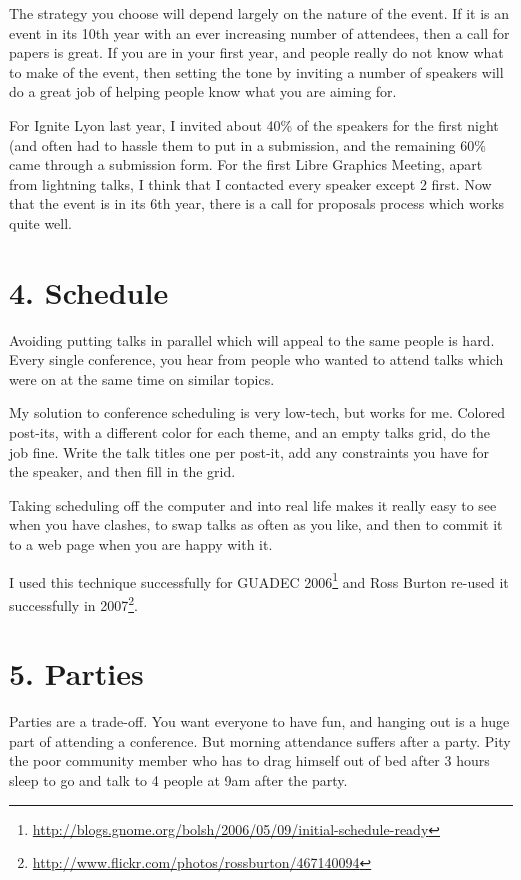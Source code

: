 The strategy you choose will depend largely on the nature of the event.
If it is an event in its 10th year with an ever increasing number of
attendees, then a call for papers is great. If you are in your first
year, and people really do not know what to make of the event, then
setting the tone by inviting a number of speakers will do a great job of
helping people know what you are aiming for.

For Ignite Lyon last year, I invited about 40\% of the speakers for the
first night (and often had to hassle them to put in a submission, and
the remaining 60\% came through a submission form. For the first Libre
Graphics Meeting, apart from lightning talks, I think that I contacted
every speaker except 2 first. Now that the event is in its 6th year,
there is a call for proposals process which works quite well.

\section*{4. Schedule}

Avoiding putting talks in parallel which will appeal to the same people
is hard. Every single conference, you hear from people who wanted to
attend talks which were on at the same time on similar topics.

My solution to conference scheduling is very low-tech, but works for me.
Colored post-its, with a different color for each theme, and an empty
talks grid, do the job fine. Write the talk titles one per post-it, add
any constraints you have for the speaker, and then fill in the grid.

Taking scheduling off the computer and into real life makes it really
easy to see when you have clashes, to swap talks as often as you like,
and then to commit it to a web page when you are happy with it.

I used this technique successfully for GUADEC
2006\footnote{\url{
http://blogs.gnome.org/bolsh/2006/05/09/initial-schedule-ready}} and Ross
Burton re-used it successfully in
2007\footnote{\url{http://www.flickr.com/photos/rossburton/467140094}}.

\section*{5. Parties}

Parties are a trade-off. You want everyone to have fun, and hanging out
is a huge part of attending a conference. But morning attendance suffers
after a party. Pity the poor community member who has to drag himself
out of bed after 3 hours sleep to go and talk to 4 people at 9am after
the party.

